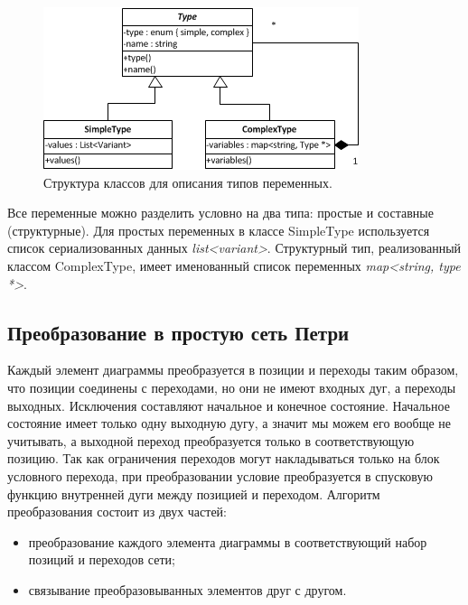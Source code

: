 \begin{figure}
	\begin{center}
		\includegraphics[scale=1]{include/Type.png}
	\end{center}
	\caption{Структура классов для описания типов переменных.}
	\label{fig:fig21}
\end{figure}

Все переменные можно разделить условно на два типа: простые и составные (структурные). Для простых переменных в классе SimpleType используется список сериализованных данных \textit{list<variant>}. Структурный тип, реализованный классом ComplexType, имеет именованный список переменных \textit{map<string, type *>}.	

\subsection{Преобразование в простую сеть Петри}

Каждый элемент диаграммы преобразуется в позиции и переходы таким образом, что позиции соединены с переходами, но они не имеют входных дуг, а переходы выходных. Исключения составляют начальное и конечное состояние. Начальное состояние имеет только одну выходную дугу, а значит мы можем его вообще не учитывать, а выходной переход преобразуется только в соответствующую позицию. Так как ограничения переходов могут накладываться только на блок условного перехода, при преобразовании условие преобразуется в спусковую функцию внутренней дуги между позицией и переходом.
Алгоритм преобразования состоит из двух частей:
\begin{itemize}
\item преобразование каждого элемента диаграммы в соответствующий набор позиций и переходов сети;
\item связывание преобразовыванных элементов друг с другом.
\end{itemize}

